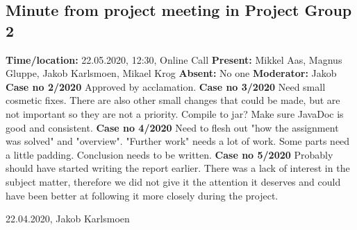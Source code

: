 \documentclass{article}
\begin{document}
\subsection{Minute from project meeting in Project Group 2}
\newline
\textbf{Time/location:} 22.05.2020, 12:30, Online Call
\newline
\textbf{Present: }Mikkel Aas, Magnus Gluppe, Jakob Karlsmoen, Mikael Krog
\newline
\textbf{Absent:} No one
\newline
\textbf{Moderator:} Jakob
\newline \newline
\textbf{Case no 2/2020} \newline
Approved by acclamation.
\newline  \newline
\textbf{Case no 3/2020}  \newline
Need small cosmetic fixes. There are also other small changes that could be made, but are not important so they are not a priority. Compile to jar? Make sure JavaDoc is good and consistent.
\newline  \newline
\textbf{Case no 4/2020}  \newline
Need to flesh out "how the assignment was solved" and "overview". "Further work" needs a lot of work. Some parts need a little padding. Conclusion needs to be written.
\newline  \newline
\textbf{Case no 5/2020}  \newline
Probably should have started writing the report earlier. There was a lack of interest in the subject matter, therefore we did not give it the attention it deserves and could have been better at following it more closely during the project.
\begin{flushright} 22.04.2020, Jakob Karlsmoen\end{flushright}
\end{document}
